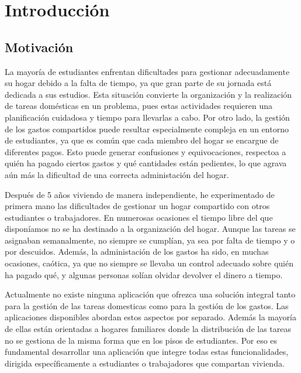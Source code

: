 \documentclass{article}
\title{}
\author{}
\date{}
\begin{document}
\maketitle

\section{Introducción}

\subsection{Motivación}

La mayoría de estudiantes enfrentan dificultades para gestionar adecuadamente su hogar debido a la falta de tiempo, ya que gran parte de su jornada
está dedicada a sus estudios. Esta situación convierte la organización y la realización de tareas domésticas en un problema, pues estas actividades requieren 
una planificación cuidadosa y tiempo para llevarlas a cabo. Por otro lado, la gestión de los gastos compartidos puede resultar especialmente compleja en un entorno 
de estudiantes, ya que es común que cada miembro del hogar se encargue de diferentes pagos. Esto puede generar confusiones y equivocaciones, 
respectoa a quién ha pagado ciertos gastos y qué cantidades están pedientes, lo que agrava aún más la dificultad de una correcta
administación del hogar.

Después de 5 años viviendo de manera independiente, he experimentado de primera mano las dificultades de gestionar un hogar compartido con otros estudiantes o trabajadores. En numerosas ocasiones 
el tiempo libre del que disponíamos no se ha destinado a la organización del hogar. Aunque las tareas se asignaban semanalmente, no siempre se cumplían, ya sea
por falta de tiempo y o por descuidos. Además, la administación de los gastos ha sido, en muchas ocasiones, caótica, ya que no siempre se llevaba un control adecuado sobre quién ha pagado qué,
y algunas personas solían olvidar devolver el dinero a tiempo.  

Actualmente no existe ninguna aplicación que ofrezca una solución integral tanto para la gestión de las tareas domesticas como para la gestión de los gastos. Las aplicaciones
disponibles abordan estos aspectos por separado. Además la mayoría de ellas están orientadas a hogares familiares donde la distribución de las tareas no se gestiona de la misma forma que 
en los pisos de estudiantes. Por eso es fundamental desarrollar una aplicación que integre todas estas funcionalidades, dirigida específicamente a estudiantes o trabajadores que compartan vivienda.
\end{document}
